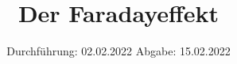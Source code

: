 

\subject{V46}
\title{Der Faradayeffekt}
\date{%
  Durchführung: 02.02.2022
  \hspace{3em}
  Abgabe: 15.02.2022
}



\maketitle
\thispagestyle{empty}
\tableofcontents
\newpage







\printbibliography{}


